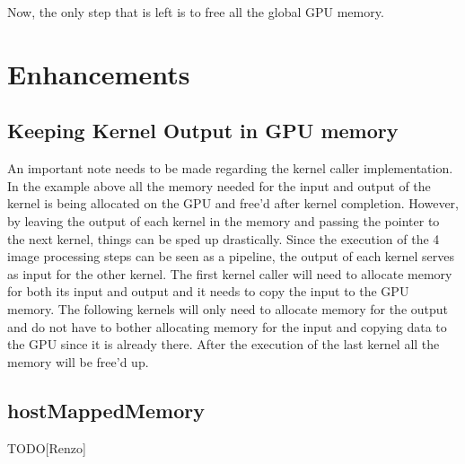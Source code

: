 \documentclass[final]{report}
\begin{document}

Now, the only step that is left is to free all the global GPU memory.

\section{Enhancements}
\subsection{Keeping Kernel Output in GPU memory}
An important note needs to be made regarding the kernel caller implementation.
In the example above all the memory needed for the input and output of the kernel is being allocated on the GPU and free'd after kernel completion.
However, by leaving the output of each kernel in the memory and passing the pointer to the next kernel, things can be sped up drastically.
Since the execution of the 4 image processing steps can be seen as a pipeline, the output of each kernel serves as input for the other kernel.
The first kernel caller will need to allocate memory for both its input and output and it needs to copy the input to the GPU memory.
The following kernels will only need to allocate memory for the output and do not have to bother allocating memory for the input and copying data to the GPU since it is already there.
After the execution of the last kernel all the memory will be free'd up.

\subsection{hostMappedMemory}
TODO[Renzo]

\end{document}
